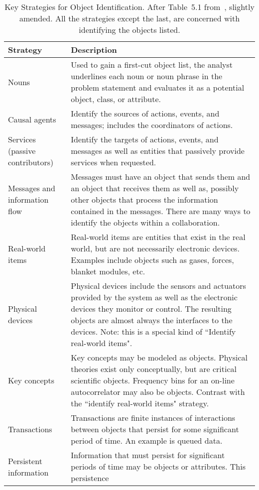 \begin{table}[h]
\begin{center}
\caption{Key Strategies for Object Identification. After Table~5.1 from~\cite{douglass},
slightly amended.
All the strategies except the last, are concerned with identifying the objects listed.
\label{tab:objdisc}}
\begin{tabular}{|p{3.5cm}|p{12.0cm}|}
\hline
Strategy &  Description \\
\hline
\hline
Nouns  &  Used to gain a first-cut object list, the 
analyst underlines each noun or noun phrase in the problem statement and 
evaluates it as a potential object, class, or attribute. \\
\hline
Causal agents &  Identify the sources of actions, events, and messages; includes the 
coordinators of actions. \\
\hline
Services (passive contributors) &  Identify the 
targets of actions, events, and messages as well as entities that passively 
provide services when requested. \\
\hline
Messages and information flow &  Messages 
must have an object that sends them and an object that receives them as well 
as, possibly other objects that process the information contained in the messages.
There are many ways to identify the objects within a collaboration.  \\
\hline
Real-world items &  Real-world items are entities that 
exist in the real world, but are not necessarily electronic devices.  Examples 
include objects such as gases, forces,
blanket modules, etc. \\
\hline
Physical devices &  Physical devices include the sensors and actuators provided by the 
system as well as the electronic devices they monitor or control.  The resulting
objects are almost always the interfaces to the devices.
Note: this is a special kind of ``Identify real-world items". \\
\hline
Key concepts &  Key concepts may be modeled as objects.  Physical theories exist
only conceptually, but are critical scientific objects.  Frequency bins
for an on-line autocorrelator may also be objects. Contrast with
the ``identify real-world items" strategy. \\
\hline
Transactions &  Transactions are finite instances of interactions 
between objects that persist for some significant period of time. An example
is queued data. \\
\hline
Persistent information &  Information that must 
persist for significant periods of time may be objects or attributes.  This persistence

\end{tabular}
\end{center}
\end{table}
